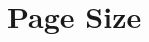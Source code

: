 \hypertarget{group___f_l_a_s_h_ex___page___size}{}\section{Page Size}
\label{group___f_l_a_s_h_ex___page___size}

